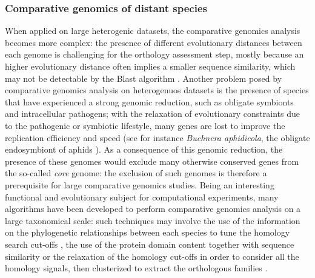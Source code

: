\subsubsection{Comparative genomics of distant species}
When applied on large heterogenic datasets, the comparative genomics analysis becomes more complex: the presence of different evolutionary distances between each genome is challenging for the orthology assessment step, mostly because an higher evolutionary distance often implies a smaller sequence similarity, which may not be detectable by the Blast algorithm \cite{kim2007clustering}. Another problem posed by comparative genomics analysis on heterogenuos datasets is the presence of species that have experienced a strong genomic reduction, such as obligate symbionts and intracellular pathogens; with the relaxation of evolutionary constraints due to the pathogenic or symbiotic lifestyle, many genes are lost to improve the replication efficiency and speed (see for instance \textit{Buchnera aphidicola}, the obligate endosymbiont of aphids \cite{tamas200250}). As a consequence of this genomic reduction, the presence of these genomes would exclude many otherwise conserved genes from the so-called \textit{core} genome: the exclusion of such genomes is therefore a prerequisite for large comparative genomics studies. Being an interesting functional and evolutionary subject for computational experiments, many algorithms have been developed to perform comparative genomics analysis on a large taxonomical scale: such techniques may involve the use of the information on the phylogenetic relationships between each species to tune the homology search cut-offs \cite{rehmsmeier2001phylogenetic} \cite{qian2003detecting} \cite{qian2004performance}, the use of the protein domain content together with sequence similarity \cite{qian2003detecting} \cite{qian2004performance} \cite{hollich2007pfamalyzer} or the relaxation of the homology cut-offs in order to consider all the homology signals, then clusterized to extract the orthologous families \cite{kim2007clustering}.

\newpage

